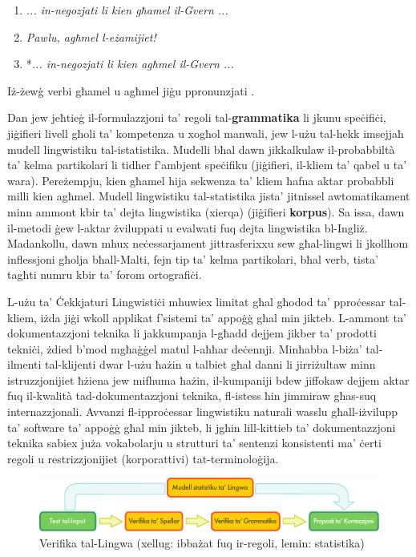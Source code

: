 \documentclass[]{../../metanetpaper}
\begin{document}
\begin{multicols}{2}
\begin{enumerate} %
\item \textit{... in-negozjati li kien għamel il-Gvern ...}
\item \textit{Pawlu, agħmel l-eżamijiet!}
\item *\textit{... in-negozjati li kien agħmel il-Gvern ...}
\end{enumerate}

Iż-żewġ verbi għamel  u agħmel jiġu ppronunzjati .

Dan jew jeħtieġ il-formulazzjoni ta’ regoli tal-\textbf{grammatika} li jkunu  speċifiċi, jiġifieri livell għoli ta’ kompetenza u xogħol manwali, jew l-użu tal-hekk imsejjaħ mudell lingwistiku tal-istatistika. Mudelli bħal dawn jikkalkulaw il-probabbiltà ta’ kelma partikolari li tidher f’ambjent speċifiku (jiġifieri, il-kliem ta’ qabel u ta’ wara). Pereżempju, kien għamel hija sekwenza ta’ kliem ħafna aktar probabbli milli kien agħmel. Mudell lingwistiku tal-statistika jista’ jitnissel awtomatikament  minn ammont kbir ta’ dejta lingwistika (xierqa) (jiġifieri \textbf{korpus}). Sa issa, dawn il-metodi ġew l-aktar żviluppati u evalwati fuq dejta lingwistika bl-Ingliż. Madankollu, dawn mhux neċessarjament jittrasferixxu sew għal-lingwi li jkollhom inflessjoni għolja bħall-Malti, fejn tip ta’ kelma partikolari, bħal verb, tista’ tagħti numru kbir ta’ forom ortografiċi.

L-użu ta’ Ċekkjaturi Lingwistiċi mhuwiex limitat għal għodod ta’ pproċessar tal-kliem, iżda jiġi wkoll applikat f’sistemi ta’ appoġġ għal min jikteb. L-ammont ta’ dokumentazzjoni teknika li jakkumpanja l-għadd dejjem jikber ta’ prodotti tekniċi, żdied b’mod mgħaġġel matul l-aħħar deċennji. Minħabba l-biża’ tal-ilmenti tal-klijenti dwar l-użu ħażin u talbiet għal danni li jirriżultaw minn istruzzjonijiet ħżiena jew mifhuma ħażin, il-kumpaniji bdew jiffokaw dejjem aktar fuq il-kwalità tad-dokumentazzjoni teknika, fl-istess ħin jimmiraw għas-suq internazzjonali. Avvanzi fl-ipproċessar lingwistiku naturali wasslu għall-iżvilupp ta’ software ta’ appoġġ għal min jikteb, li jgħin lill-kittieb ta’ dokumentazzjoni teknika sabiex juża vokabolarju u strutturi ta’ sentenzi konsistenti ma’ ċerti regoli u restrizzjonijiet (korporattivi) tat-terminoloġija. 

\begin{figure}[htb]
  \center
  \includegraphics[width=\textwidth]{../_media/maltese/language_checking}
  \caption{Verifika tal-Lingwa (xellug: ibbażat fuq ir-regoli, lemin: statistika)}
  \label{fig:langcheckingaarch_mt}
\end{figure}


\end{multicols}
\end{document}
